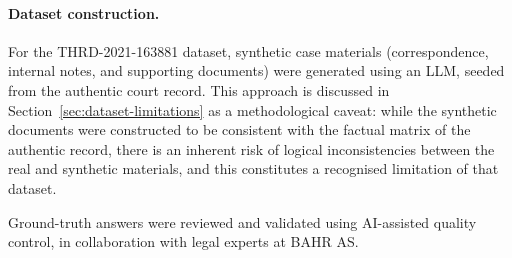 \paragraph{Dataset construction.}
For the THRD-2021-163881 dataset, synthetic case materials (correspondence, internal notes, and supporting documents) were generated using an LLM, seeded from the authentic court record. This approach is discussed in Section~\ref{sec:dataset-limitations} as a methodological caveat: while the synthetic documents were constructed to be consistent with the factual matrix of the authentic record, there is an inherent risk of logical inconsistencies between the real and synthetic materials, and this constitutes a recognised limitation of that dataset.

Ground-truth answers were reviewed and validated using AI-assisted quality control, in collaboration with legal experts at BAHR AS.

